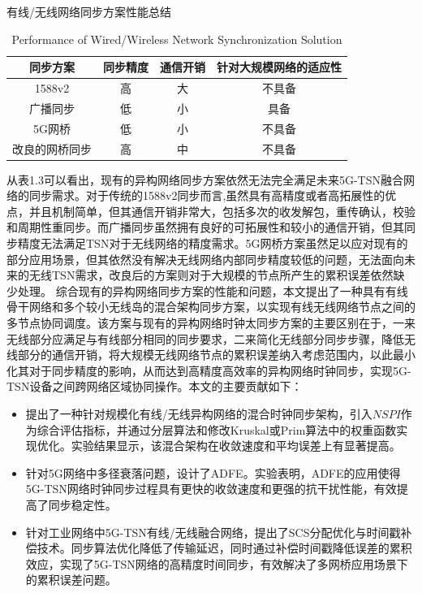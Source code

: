 \documentclass[UTF8,a4paper,12pt]{ctexart}
\numberwithin{equation}{section}
\begin{document}
\begin{table}[!htbp]
	\centering
	\caption{有线/无线网络同步方案性能总结}
	\vspace{-10pt}
	\caption{Performance of Wired/Wireless Network Synchronization Solution}
	\begin{tabular}{|c| c|c|c|}
		\hline
\textbf{同步方案}   &\textbf{同步精度}  & \textbf{通信开销}  & \textbf{针对大规模网络的适应性}  \\
\hline
1588v2    & 高   & 大    & 不具备                \\
\hline
广播同步 &  低 &  小 & 具备   \\
\hline
5G网桥 &低   &小     &不具备  \\
\hline
改良的网桥同步 &高  & 中        & 不具备    \\
\hline
	\end{tabular}
\end{table}

从表1.3可以看出，现有的异构网络同步方案依然无法完全满足未来5G-TSN融合网络的同步需求。对于传统的1588v2同步而言,虽然具有高精度或者高拓展性的优点，并且机制简单，但其通信开销非常大，包括多次的收发解包，重传确认，校验和周期性重同步。而广播同步虽然拥有良好的可拓展性和较小的通信开销，但其同步精度无法满足TSN对于无线网络的精度需求。5G网桥方案虽然足以应对现有的部分应用场景，但其依然没有解决无线网络内部同步精度较低的问题，无法面向未来的无线TSN需求，改良后的方案则对于大规模的节点所产生的累积误差依然缺少处理。
综合现有的异构网络同步方案的性能和问题，本文提出了一种具有有线骨干网络和多个较小无线岛的混合架构同步方案，以实现有线无线网络节点之间的多节点协同调度。该方案与现有的异构网络时钟太同步方案的主要区别在于，一来无线部分应满足与有线部分相同的同步要求，二来简化无线部分同步步骤，降低无线部分的通信开销，将大规模无线网络节点的累积误差纳入考虑范围内，以此最小化其对于同步精度的影响，从而达到高精度高效率的异构网络时钟同步，实现5G-TSN设备之间跨网络区域协同操作。本文的主要贡献如下：
\begin{itemize}
	\item 提出了一种针对规模化有线/无线异构网络的混合时钟同步架构，引入$NSPI$作为综合评估指标，并通过分层算法和修改Kruskal或Prim算法中的权重函数实现优化。实验结果显示，该混合架构在收敛速度和平均误差上有显著提高。
	
	\item 针对5G网络中多径衰落问题，设计了ADFE。实验表明，ADFE的应用使得5G-TSN网络时钟同步过程具有更快的收敛速度和更强的抗干扰性能，有效提高了同步稳定性。
	
	\item 针对工业网络中5G-TSN有线/无线融合网络，提出了SCS分配优化与时间戳补偿技术。同步算法优化降低了传输延迟，同时通过补偿时间戳降低误差的累积效应，实现了5G-TSN网络的高精度时间同步，有效解决了多网桥应用场景下的累积误差问题。
\end{itemize}
\end{document}
